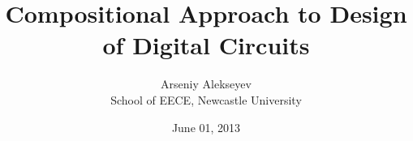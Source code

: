 \documentclass[12pt,english,british]{report}
\begin{document}
\title{Compositional Approach to Design of Digital Circuits}

\date{June 01, 2013}

\newcommand{\EECE}{School of EECE, Newcastle University}

\author{Arseniy Alekseyev\\ \EECE}

\maketitle

\setcounter{page}{1}

\tableofcontents
\newpage

\setcounter{page}{1}






\end{document}
